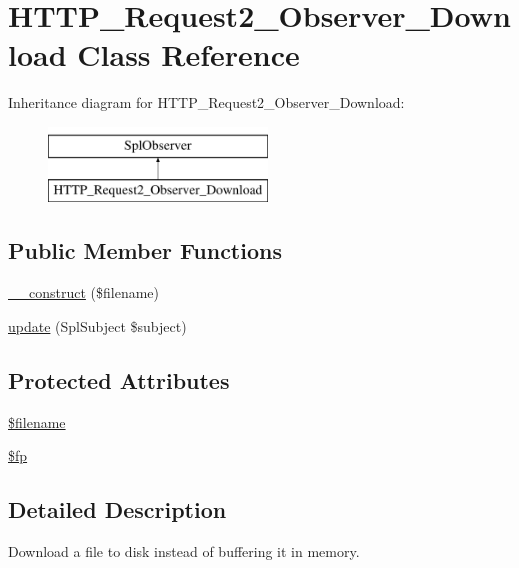 \hypertarget{classHTTP__Request2__Observer__Download}{\section{H\-T\-T\-P\-\_\-\-Request2\-\_\-\-Observer\-\_\-\-Download Class Reference}
\label{classHTTP__Request2__Observer__Download}
}
Inheritance diagram for H\-T\-T\-P\-\_\-\-Request2\-\_\-\-Observer\-\_\-\-Download\-:\begin{figure}[H]
\begin{center}
\leavevmode
\includegraphics[height=2.000000cm]{classHTTP__Request2__Observer__Download}
\end{center}
\end{figure}
\subsection*{Public Member Functions}
\begin{DoxyCompactItemize}
\item 
\hyperlink{classHTTP__Request2__Observer__Download_a67e1f188f88776fa87dc69280ad41ea1}{\-\_\-\-\_\-construct} (\$filename)
\item 
\hyperlink{classHTTP__Request2__Observer__Download_a5be07b74ddd29343e85fed87bef999eb}{update} (Spl\-Subject \$subject)
\end{DoxyCompactItemize}
\subsection*{Protected Attributes}
\begin{DoxyCompactItemize}
\item 
\hyperlink{classHTTP__Request2__Observer__Download_a8d465a7b54376270b909228207640680}{\$filename}
\item 
\hyperlink{classHTTP__Request2__Observer__Download_a25e23c48a242ef021c465dde71719183}{\$fp}
\end{DoxyCompactItemize}


\subsection{Detailed Description}
Download a file to disk instead of buffering it in memory.

